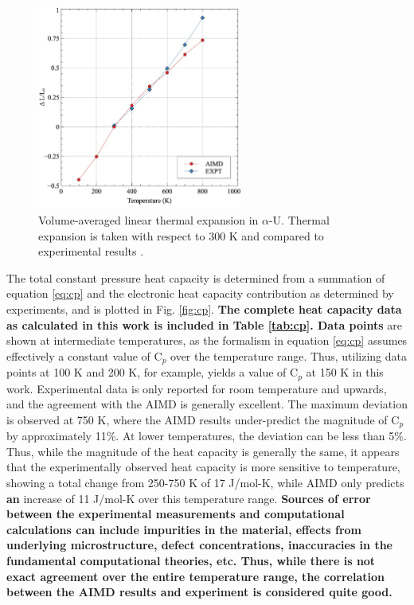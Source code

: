 \documentclass[utf8]{frontiersSCNS} %
\providecommand{\DIFaddtex}[1]{{\bf #1}} %
\providecommand{\DIFdeltex}[1]{} %
\providecommand{\DIFaddbegin}{\protect\color{blue}} %
\providecommand{\DIFaddend}{\protect\color{black}} %
\providecommand{\DIFdelbegin}{\protect\color{red}} %
\providecommand{\DIFdelend}{\protect\color{black}} %
\providecommand{\DIFaddbeginFL}{} %
\providecommand{\DIFaddendFL}{} %
\providecommand{\DIFdelbeginFL}{} %
\providecommand{\DIFdelendFL}{} %
\providecommand{\DIFadd}[1]{\texorpdfstring{\DIFaddtex{#1}}{#1}} %
\providecommand{\DIFdel}[1]{\texorpdfstring{\DIFdeltex{#1}}{}} %
\begin{document}
 \begin{figure}[hbt]
	\centering
	\DIFdelbeginFL %
\DIFdelendFL \DIFaddbeginFL \includegraphics[width=0.6\textwidth]{vte.jpg}
  \DIFaddendFL \caption{Volume-averaged linear thermal expansion in $\alpha$-U. Thermal expansion is taken with respect to 300 K and compared to experimental results \cite{touloukian}.}\label{fig:vol}
\end{figure}

The total constant pressure heat capacity is determined from a summation of equation \ref{eq:cp} and the electronic heat capacity contribution as determined by experiments, and is plotted in Fig. \ref{fig:cp}. \DIFdelbegin \DIFdel{Data point }\DIFdelend \DIFaddbegin \DIFadd{The complete heat capacity data as calculated in this work is included in Table \ref{tab:cp}. Data points }\DIFaddend are shown at intermediate temperatures, as the formalism in equation \ref{eq:cp} assumes effectively a constant value of C$_p$ over the temperature range. Thus, utilizing data points at 100 K and 200 K, for example, yields a value of C$_p$ at 150 K in this work. Experimental data is only reported for room temperature and upwards, and the agreement with the AIMD is generally excellent. The maximum deviation is observed at 750 K, where the AIMD results under-predict the magnitude of C$_p$ by approximately 11\%. At lower temperatures, the deviation can be less than 5\%. Thus, while the magnitude of the heat capacity is generally the same, it appears that the experimentally observed heat capacity is more sensitive to temperature, showing a total change from 250-750 K of 17 J/mol-K, while AIMD only predicts \DIFdelbegin \DIFdel{at }\DIFdelend \DIFaddbegin \DIFadd{an }\DIFaddend increase of 11 J/mol-K over this temperature range. \DIFaddbegin \DIFadd{Sources of error between the experimental measurements and computational calculations can include impurities in the material, effects from underlying microstructure, defect concentrations, inaccuracies in the fundamental computational theories, etc. Thus, while there is not exact agreement over the entire temperature range, the correlation between the AIMD results and experiment is considered quite good. 
}\DIFaddend 
\end{document}
